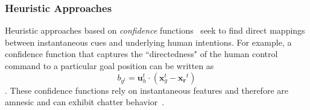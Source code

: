 \documentclass[letterpaper, 10 pt, conference]{ieeeconf}  %
\newcommand{\norm}[1]{\left\lVert#1\right\rVert}
\begin{document}

\subsubsection{Heuristic Approaches}
Heuristic approaches based on \textit{confidence} functions~\cite{gopinath2017human} seek to find direct mappings between instantaneous cues and underlying human intentions. 
For example, a confidence function that captures the ``directedness" of the human control command to a particular goal position can be written as 
% 
\begin{equation*}
	b_{g^t} =  \boldsymbol{u}_h^t\cdot(\boldsymbol{x}_{g}^t - \boldsymbol{x_r}^t)
\end{equation*}
. These confidence functions rely on instantaneous features and therefore are amnesic and can exhibit chatter behavior~\cite{dragan2012formalizing}. 

\end{document}
